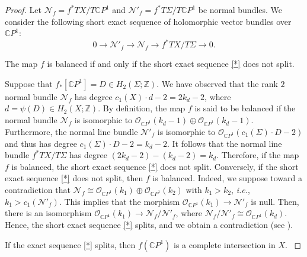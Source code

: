 \documentclass[10pt,a4paper]{article}
\numberwithin{equation}{section}
\theoremstyle{definition}
\theoremstyle{plain}
\theoremstyle{remark}
\newenvironment{claim}[1]{\renewcommand\theinnercustomclaim{#1}\innercustomclaim}{\endinnercustomclaim}
\newcommand{\Z}{\mathbb{Z}}
\newcommand{\C}{\mathbb{C}}
\begin{document}
\begin{proof}
 Let $\mathcal{N}_f=f^*TX/T\C P^1$ and   $\mathcal{N}'_f=f^*T\Sigma/T\C P^1$ be normal bundles.
We consider the following short exact sequence of holomorphic vector bundles over $\C P^1$:
\begin{equation*}\tag{*}\label{*}
    0\longrightarrow \mathcal{N}'_f \longrightarrow \mathcal{N}_f  \longrightarrow f^*TX/T\Sigma \longrightarrow 0.
\end{equation*}

\begin{claim}{1}\label{claim3.5-1}
  The map $f$ is balanced if and only if the short exact sequence \eqref{*} does not split.
  \end{claim}

Suppose that $f_*[\C P^1]=D\in H_2(\Sigma;\Z)$.
We have observed that the rank $2$ normal bundle $\mathcal{N}_f$ has degree $c_1(X)\cdot d-2=2k_d-2$, where $d=\psi(D)\in H_2(X;\Z)$. By definition,  the map $f$ is said to be balanced if the normal bundle $\mathcal{N}_f$ is isomorphic to $\mathcal{O}_{\C P^1}(k_d-1)\oplus \mathcal{O}_{\C P^1}(k_d-1)$. Furthermore, the normal line bundle $\mathcal{N}'_f$ is isomorphic to $\mathcal{O}_{\C P^1}(c_1(\Sigma)\cdot D -2)$ and thus has degree $c_1(\Sigma)\cdot D -2=k_d-2$. It follows that the normal line bundle $f^*TX/T\Sigma$ has degree  $(2k_d-2)-(k_d-2)=k_d$. Therefore, if the map $f$ is balanced, the short exact sequence \eqref{*} does not split. Conversely, if the short exact sequence \eqref{*} does not split, then $f$ is balanced. Indeed, we suppose toward a contradiction that $\mathcal{N}_f\cong\mathcal{O}_{\C P^1}(k_1)\oplus \mathcal{O}_{\C P^1}(k_2)$ with $k_1>k_2$, \textit{i.e.}, $k_1>c_1(\mathcal{N}'_f)$. This implies that the morphism $\mathcal{O}_{\C P^1}(k_1)\to \mathcal{N}'_f$ is null. Then, there is an isomorphism $\mathcal{O}_{\C P^1}(k_1)\to \mathcal{N}_f/\mathcal{N}'_f$, where $\mathcal{N}_f/\mathcal{N}'_f\cong \mathcal{O}_{\C P^1}(k_d)$. Hence, the short exact sequence \eqref{*} splits, and we obtain a contradiction (see \cite[p.~252]{griffiths1983infinitesimal}).

\begin{claim}{2}\label{claim3.5-2}
  If the exact sequence \eqref{*}  splits, then $f(\C P^1)$ is a complete intersection in $X$.
  \end{claim}


\end{proof}
\end{document}
